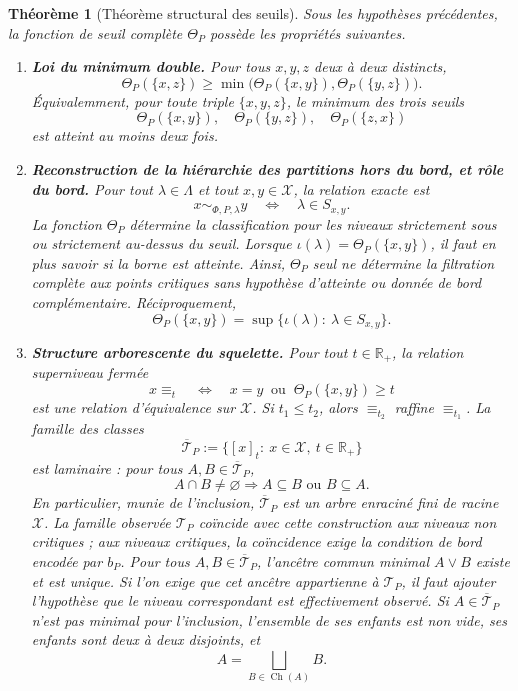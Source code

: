 \documentclass[11pt,a4paper,openany]{book}
\newtheorem{theorem}[definition]{Théorème}
\begin{document}
\begin{theorem}[Théorème structural des seuils]
Sous les hypothèses précédentes, la fonction de seuil complète \(\Theta_P\) possède les propriétés suivantes.
\begin{enumerate}[label=\textbf{(\Alph*)}]
\item \textbf{Loi du minimum double.} Pour tous \(x,y,z\) deux à deux distincts,
\[
\Theta_P(\{x,z\})\ge \min\bigl(\Theta_P(\{x,y\}),\Theta_P(\{y,z\})\bigr).
\]
Équivalemment, pour toute triple \(\{x,y,z\}\), le minimum des trois seuils
\[
\Theta_P(\{x,y\}),\quad \Theta_P(\{y,z\}),\quad \Theta_P(\{z,x\})
\]
est atteint au moins deux fois.

\item \textbf{Reconstruction de la hiérarchie des partitions hors du bord, et rôle du bord.} Pour tout \(\lambda\in\Lambda\) et tout \(x,y\in\mathcal X\), la relation exacte est
\[
x\sim_{\Phi,P,\lambda}y
\quad\Longleftrightarrow\quad
\lambda\in S_{x,y}.
\]
La fonction \(\Theta_P\) détermine la classification pour les niveaux strictement sous ou strictement au-dessus du seuil. Lorsque \(\iota(\lambda)=\Theta_P(\{x,y\})\), il faut en plus savoir si la borne est atteinte. Ainsi, \(\Theta_P\) seul ne détermine la filtration complète aux points critiques sans hypothèse d'atteinte ou donnée de bord complémentaire. Réciproquement,
\[
\Theta_P(\{x,y\})
=
\sup\{\iota(\lambda):\ \lambda\in S_{x,y}\}.
\]

\item \textbf{Structure arborescente du squelette.} Pour tout \(t\in\mathbb R_+\), la relation superniveau fermée
\[
x\equiv_t
\quad\Longleftrightarrow\quad
x=y\ \text{ ou }\ \Theta_P(\{x,y\})\ge t
\]
est une relation d'équivalence sur \(\mathcal X\). Si \(t_1\le t_2\), alors \(\equiv_{t_2}\) raffine \(\equiv_{t_1}\). La famille des classes
\[
\overline{\mathcal T}_P:=\{[x]_t:\ x\in\mathcal X,\ t\in\mathbb R_+\}
\]
est laminaire : pour tous \(A,B\in\overline{\mathcal T}_P\),
\[
A\cap B\neq\varnothing \Longrightarrow A\subseteq B \text{ ou } B\subseteq A.
\]
En particulier, munie de l'inclusion, \(\overline{\mathcal T}_P\) est un arbre enraciné fini de racine \(\mathcal X\). La famille observée \(\mathcal T_P\) coïncide avec cette construction aux niveaux non critiques ; aux niveaux critiques, la coïncidence exige la condition de bord encodée par \(b_P\). Pour tous \(A,B\in\overline{\mathcal T}_P\), l'ancêtre commun minimal \(A\vee B\) existe et est unique. Si l'on exige que cet ancêtre appartienne à \(\mathcal T_P\), il faut ajouter l'hypothèse que le niveau correspondant est effectivement observé. Si \(A\in\overline{\mathcal T}_P\) n'est pas minimal pour l'inclusion, l'ensemble de ses enfants est non vide, ses enfants sont deux à deux disjoints, et
\[
A=\bigsqcup_{B\in\operatorname{Ch}(A)}B.
\]


\end{enumerate}
\end{theorem}
\end{document}
